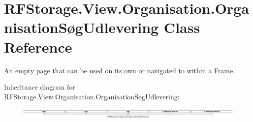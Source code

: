 \hypertarget{class_r_f_storage_1_1_view_1_1_organisation_1_1_organisation_s_xC3_xB8g_udlevering}{}\section{R\+F\+Storage.\+View.\+Organisation.\+Organisation\+Søg\+Udlevering Class Reference}
\label{class_r_f_storage_1_1_view_1_1_organisation_1_1_organisation_s_xC3_xB8g_udlevering}


An empty page that can be used on its own or navigated to within a Frame.  


Inheritance diagram for R\+F\+Storage.\+View.\+Organisation.\+Organisation\+Søg\+Udlevering\+:\begin{figure}[H]
\begin{center}
\leavevmode
\includegraphics[height=0.591029cm]{class_r_f_storage_1_1_view_1_1_organisation_1_1_organisation_s_xC3_xB8g_udlevering}
\end{center}
\end{figure}
